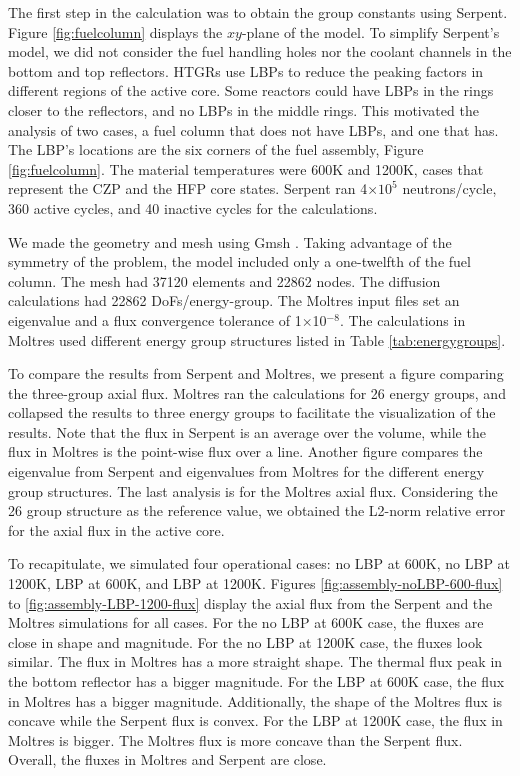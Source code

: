 \documentclass[11pt,letterpaper]{article}
\begin{document}
The first step in the calculation was to obtain the group constants using Serpent.
Figure \ref{fig:fuelcolumn} displays the $xy$-plane of the model.
To simplify Serpent's model, we did not consider the fuel handling holes nor the coolant channels in the bottom and top reflectors.
\glspl{HTGR} use \glspl{LBP} to reduce the peaking factors in different regions of the active core.
Some reactors could have \glspl{LBP} in the rings closer to the reflectors, and no \glspl{LBP} in the middle rings.
This motivated the analysis of two cases, a fuel column that does not have \glspl{LBP}, and one that has.
The LBP's locations are the six corners of the fuel assembly, Figure \ref{fig:fuelcolumn}.
The material temperatures were 600K and 1200K, cases that represent the \gls{CZP} and the \gls{HFP} core states.
Serpent ran 4$\times 10^5$ neutrons/cycle, 360 active cycles, and 40 inactive cycles for the calculations.

We made the geometry and mesh using Gmsh \cite{geuzaine_gmsh_2020}.
Taking advantage of the symmetry of the problem, the model included only a one-twelfth of the fuel column.
The mesh had 37120 elements and 22862 nodes.
The diffusion calculations had 22862 \glspl{DoF}/energy-group.
The Moltres input files set an eigenvalue and a flux convergence tolerance of 1$\times$10$^{-8}$.
The calculations in Moltres used different energy group structures listed in Table \ref{tab:energygroups}.

To compare the results from Serpent and Moltres, we present a figure comparing the three-group axial flux.
Moltres ran the calculations for 26 energy groups, and collapsed the results to three energy groups to facilitate the visualization of the results.
Note that the flux in Serpent is an average over the volume, while the flux in Moltres is the point-wise flux over a line.
Another figure compares the eigenvalue from Serpent and eigenvalues from Moltres for the different energy group structures.
The last analysis is for the Moltres axial flux.
Considering the 26 group structure as the reference value, we obtained the L2-norm relative error for the axial flux in the active core.

To recapitulate, we simulated four operational cases: no \gls{LBP} at 600K, no \gls{LBP} at 1200K, \gls{LBP} at 600K, and \gls{LBP} at 1200K.
Figures \ref{fig:assembly-noLBP-600-flux} to \ref{fig:assembly-LBP-1200-flux} display the axial flux from the Serpent and the Moltres simulations for all cases.
For the no LBP at 600K case, the fluxes are close in shape and magnitude.
For the no LBP at 1200K case, the fluxes look similar.
The flux in Moltres has a more straight shape.
The thermal flux peak in the bottom reflector has a bigger magnitude.
For the LBP at 600K case, the flux in Moltres has a bigger magnitude.
Additionally, the shape of the Moltres flux is concave while the Serpent flux is convex.
For the LBP at 1200K case, the flux in Moltres is bigger.
The Moltres flux is more concave than the Serpent flux.
Overall, the fluxes in Moltres and Serpent are close.
\end{document}
